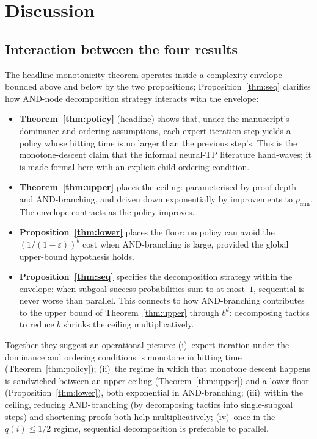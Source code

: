 \documentclass[reqno,11pt]{amsart}
\theoremstyle{plain}
\theoremstyle{definition}
\theoremstyle{remark}
\begin{document}
\section{Discussion}\label{sec:discussion}

\subsection{Interaction between the four results}

The headline monotonicity theorem operates inside a complexity envelope bounded above and below by the two propositions; Proposition~\ref{thm:seq} clarifies how AND-node decomposition strategy interacts with the envelope:
\begin{itemize}[leftmargin=*]
\item \textbf{Theorem~\ref{thm:policy}} (headline) shows that, under the manuscript's dominance and ordering assumptions, each expert-iteration step yields a policy whose hitting time is no larger than the previous step's. This is the monotone-descent claim that the informal neural-TP literature hand-waves; it is made formal here with an explicit child-ordering condition.
\item \textbf{Theorem~\ref{thm:upper}} places the ceiling: parameterised by proof depth and AND-branching, and driven down exponentially by improvements to $p_{\min}$. The envelope contracts as the policy improves.
\item \textbf{Proposition~\ref{thm:lower}} places the floor: no policy can avoid the $(1/(1-\varepsilon))^b$ cost when AND-branching is large, provided the global upper-bound hypothesis holds.
\item \textbf{Proposition~\ref{thm:seq}} specifies the decomposition strategy within the envelope: when subgoal success probabilities sum to at most~$1$, sequential is never worse than parallel. This connects to how AND-branching contributes to the upper bound of Theorem~\ref{thm:upper} through $b^d$: decomposing tactics to reduce $b$ shrinks the ceiling multiplicatively.
\end{itemize}

Together they suggest an operational picture: (i)~expert iteration under the dominance and ordering conditions is monotone in hitting time (Theorem~\ref{thm:policy}); (ii)~the regime in which that monotone descent happens is sandwiched between an upper ceiling (Theorem~\ref{thm:upper}) and a lower floor (Proposition~\ref{thm:lower}), both exponential in AND-branching; (iii)~within the ceiling, reducing AND-branching (by decomposing tactics into single-subgoal steps) and shortening proofs both help multiplicatively; (iv)~once in the $q(i) \le 1/2$ regime, sequential decomposition is preferable to parallel.
\end{document}
